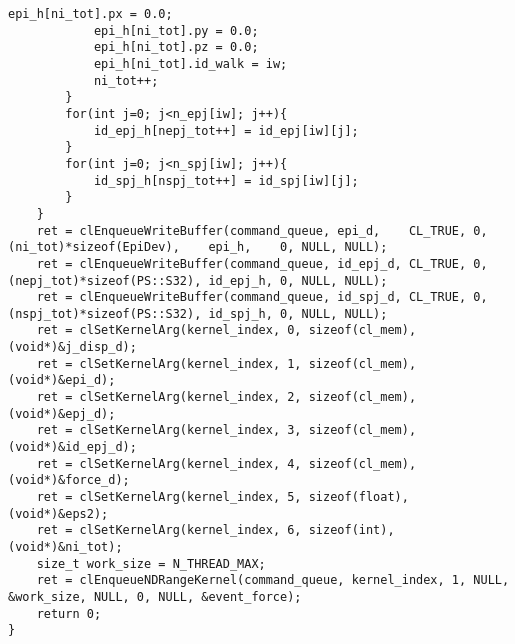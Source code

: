 \begin{itemize}
\begin{lstlisting}[caption=calcForceDispatchExample]
            epi_h[ni_tot].px = 0.0;
            epi_h[ni_tot].py = 0.0;
            epi_h[ni_tot].pz = 0.0;
            epi_h[ni_tot].id_walk = iw;
            ni_tot++;
        }
        for(int j=0; j<n_epj[iw]; j++){
            id_epj_h[nepj_tot++] = id_epj[iw][j];
        }
        for(int j=0; j<n_spj[iw]; j++){
            id_spj_h[nspj_tot++] = id_spj[iw][j];
        }
    }
    ret = clEnqueueWriteBuffer(command_queue, epi_d,    CL_TRUE, 0, (ni_tot)*sizeof(EpiDev),    epi_h,    0, NULL, NULL);
    ret = clEnqueueWriteBuffer(command_queue, id_epj_d, CL_TRUE, 0, (nepj_tot)*sizeof(PS::S32), id_epj_h, 0, NULL, NULL);
    ret = clEnqueueWriteBuffer(command_queue, id_spj_d, CL_TRUE, 0, (nspj_tot)*sizeof(PS::S32), id_spj_h, 0, NULL, NULL);    
    ret = clSetKernelArg(kernel_index, 0, sizeof(cl_mem), (void*)&j_disp_d);
    ret = clSetKernelArg(kernel_index, 1, sizeof(cl_mem), (void*)&epi_d);
    ret = clSetKernelArg(kernel_index, 2, sizeof(cl_mem), (void*)&epj_d);
    ret = clSetKernelArg(kernel_index, 3, sizeof(cl_mem), (void*)&id_epj_d);
    ret = clSetKernelArg(kernel_index, 4, sizeof(cl_mem), (void*)&force_d);
    ret = clSetKernelArg(kernel_index, 5, sizeof(float),  (void*)&eps2);
    ret = clSetKernelArg(kernel_index, 6, sizeof(int),    (void*)&ni_tot);
    size_t work_size = N_THREAD_MAX;
    ret = clEnqueueNDRangeKernel(command_queue, kernel_index, 1, NULL, &work_size, NULL, 0, NULL, &event_force);
    return 0;
}
\end{lstlisting}

\end{itemize}
